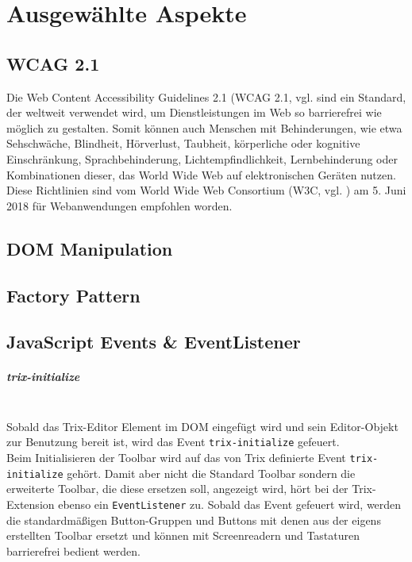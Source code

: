 \chapter{Ausgewählte Aspekte}
\section{WCAG 2.1}
Die Web Content Accessibility Guidelines 2.1 (WCAG 2.1, vgl. \cite{wcag_2_1_2018} sind ein Standard, der weltweit verwendet wird, um Dienstleistungen im Web so barrierefrei wie möglich zu gestalten. Somit können auch Menschen mit Behinderungen, wie etwa Sehschwäche, Blindheit, Hörverlust, Taubheit, körperliche oder kognitive Einschränkung, Sprachbehinderung, Lichtempfindlichkeit, Lernbehinderung oder Kombinationen dieser, das World Wide Web auf elektronischen Geräten nutzen. Diese Richtlinien sind vom World Wide Web Consortium (W3C, vgl. \cite{w3c_1994}) am 5. Juni 2018 für Webanwendungen empfohlen worden. 

\section{DOM Manipulation}

\section{Factory Pattern}

\section{JavaScript Events \& EventListener}
\paragraph{trix-initialize}\mbox{}\\
Sobald das Trix-Editor Element im DOM eingefügt wird und sein Editor-Objekt zur Benutzung bereit ist, wird das Event \texttt{trix-initialize} gefeuert.\\
Beim Initialisieren der Toolbar wird auf das von Trix definierte Event \texttt{trix-initialize} gehört. Damit aber nicht die Standard Toolbar sondern die erweiterte Toolbar, die diese ersetzen soll, angezeigt wird, hört bei der Trix-Extension ebenso ein \texttt{EventListener} zu. Sobald das Event gefeuert wird, werden die standardmäßigen Button-Gruppen und Buttons mit denen aus der eigens erstellten Toolbar ersetzt und können mit Screenreadern und Tastaturen barrierefrei bedient werden.

